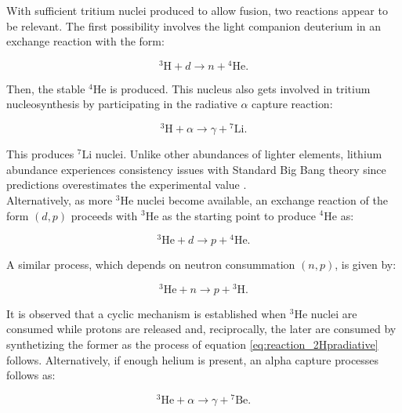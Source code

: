 \documentclass[openany]{book}
\begin{document}
With sufficient tritium nuclei produced to allow fusion, two reactions appear to be relevant. The first possibility involves the light companion deuterium in an exchange reaction with the form:

\begin{equation} \label{eq:reaction_3Hd}
	\mathrm{{}^{3}H} + d \rightarrow n + \mathrm{{}^{4}He}.
\end{equation}

Then, the stable $\mathrm{{}^{4}He}$ is produced. This nucleus also gets involved in tritium nucleosynthesis by participating in the radiative $\alpha$ capture reaction: 

\begin{equation} \label{eq:reaction_3Halpha}
	\mathrm{{}^{3}H} + \alpha \rightarrow \gamma + \mathrm{{}^{7}Li}.
\end{equation}

This produces $\mathrm{{}^{7}Li}$ nuclei. Unlike other abundances of lighter elements, lithium abundance experiences consistency issues with Standard Big Bang theory since predictions overestimates the experimental value \cite{bertulani_2019}. \\

Alternatively, as more $\mathrm{{}^{3}He}$ nuclei become available, an exchange reaction of the form $(d, p)$ proceeds with $\mathrm{{}^{3}He}$ as the starting point to produce $\mathrm{{}^{4}He}$ as: 

\begin{equation} \label{eq:reaction_3Hed}
	\mathrm{{}^{3}He} + d \rightarrow p + \mathrm{{}^{4}He}.
\end{equation}

A similar process, which depends on neutron consummation $(n, p)$, is given by: 

\begin{equation} \label{eq:reaction_3Hen}
	\mathrm{{}^{3}He} + n \rightarrow p + \mathrm{{}^{3}H}.
\end{equation}

It is observed that a cyclic mechanism is established when $\mathrm{{}^{3}He}$ nuclei are consumed while protons are released and, reciprocally, the later are consumed by synthetizing the former as the process of equation \ref{eq:reaction_2Hpradiative} follows. Alternatively, if enough helium is present, an alpha capture processes follows as:

\begin{equation} \label{eq:reaction_3Healpha}
	\mathrm{{}^{3}He} + \alpha \rightarrow \gamma + \mathrm{{}^{7}Be}.
\end{equation}
\end{document}
